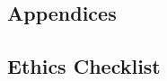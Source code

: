 \documentclass{l4proj}
\begin{document}
\begin{appendices}

\chapter{Appendices}









\section{Ethics Checklist}





\end{appendices}
\end{document}
